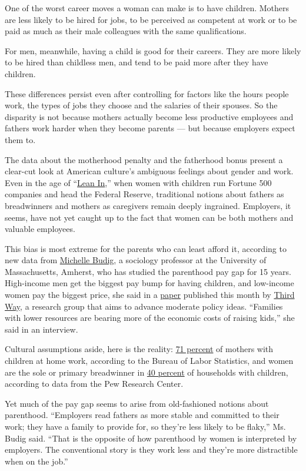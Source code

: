 One of the worst career moves a woman can make is to have children.
Mothers are less likely to be hired for jobs, to be perceived as
competent at work or to be paid as much as their male colleagues with
the same qualifications.

For men, meanwhile, having a child is good for their careers. They are
more likely to be hired than childless men, and tend to be paid more
after they have children.

These differences persist even after controlling for factors like the
hours people work, the types of jobs they choose and the salaries of
their spouses. So the disparity is not because mothers actually become
less productive employees and fathers work harder when they become
parents --- but because employers expect them to.

The data about the motherhood penalty and the fatherhood bonus present a
clear-cut look at American culture's ambiguous feelings about gender and
work. Even in the age of ``\href{http://leanin.org/book/}{Lean In},''
when women with children run Fortune 500 companies and head the Federal
Reserve, traditional notions about fathers as breadwinners and mothers
as caregivers remain deeply ingrained. Employers, it seems, have not yet
caught up to the fact that women can be both mothers and valuable
employees.

This bias is most extreme for the parents who can least afford it,
according to new data from
\href{http://www.umass.edu/sociol/faculty_staff/bios/budig.html}{Michelle
Budig}, a sociology professor at the University of Massachusetts,
Amherst, who has studied the parenthood pay gap for 15 years.
High-income men get the biggest pay bump for having children, and
low-income women pay the biggest price, she said in a
\href{http://www.thirdway.org/publications/853}{paper} published this
month by \href{http://www.thirdway.org/}{Third Way}, a research group
that aims to advance moderate policy ideas. ``Families with lower
resources are bearing more of the economic costs of raising kids,'' she
said in an interview.

Cultural assumptions aside, here is the reality:
\href{http://www.bls.gov/cps/wlf-databook-2013.pdf}{71 percent} of
mothers with children at home work, according to the Bureau of Labor
Statistics, and women are the sole or primary breadwinner in
\href{http://www.pewsocialtrends.org/2013/05/29/breadwinner-moms/}{40
percent} of households with children, according to data from the Pew
Research Center.

Yet much of the pay gap seems to arise from old-fashioned notions about
parenthood. ``Employers read fathers as more stable and committed to
their work; they have a family to provide for, so they're less likely to
be flaky,'' Ms. Budig said. ``That is the opposite of how parenthood by
women is interpreted by employers. The conventional story is they work
less and they're more distractible when on the job.''

